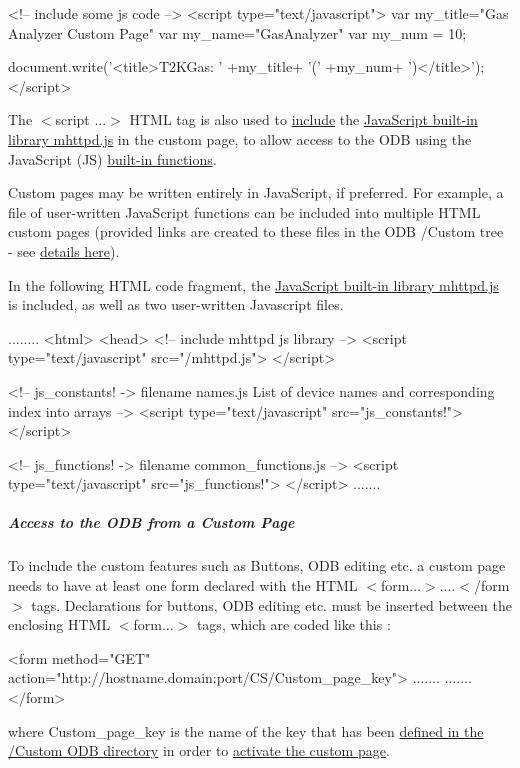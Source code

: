 \begin{DoxyCode}
<!-- include some js code -->
<script  type="text/javascript">
\code
var my_title="Gas Analyzer Custom Page"
var my_name="GasAnalyzer"
var my_num = 10;

document.write('<title>T2KGas: ' +my_title+ '(' +my_num+ ')</title>');
</script>
\end{DoxyCode}
 \par
 The $<$script ...$>$ HTML tag is also used to \hyperlink{RC_mhttpd_custom_js_lib_RC_mhttpd_include_js_library}{include} the \hyperlink{RC_mhttpd_custom_js_lib}{JavaScript built-\/in library mhttpd.js} in the custom page, to allow access to the ODB using the JavaScript (JS) \hyperlink{RC_mhttpd_custom_js_lib_RC_mhttpd_js_library_features}{built-\/in functions}. \par
Custom pages may be written entirely in JavaScript, if preferred. For example, a file of user-\/written JavaScript functions can be included into multiple HTML custom pages (provided links are created to these files in the ODB /Custom tree -\/ see \hyperlink{RC_mhttpd_Activate}{details here}).

In the following HTML code fragment, the \hyperlink{RC_mhttpd_custom_js_lib}{JavaScript built-\/in library mhttpd.js} is included, as well as two user-\/written Javascript files.


\begin{DoxyCode}
........
<html>
<head>
<!-- include mhttpd js library   -->
<script type="text/javascript"  src="/mhttpd.js">
</script>

<!-- js_constants! -> filename  names.js
List of device names and corresponding index into arrays
 -->
<script type="text/javascript"  src="js_constants!">
</script>

<!-- js_functions! -> filename  common_functions.js
 -->      
<script type="text/javascript"  src="js_functions!">
</script>
.......
\end{DoxyCode}




\hypertarget{RC_mhttpd_custom_features_RC_mhttpd_custom_key_access}{}\subparagraph{Access to the ODB from a Custom Page}\label{RC_mhttpd_custom_features_RC_mhttpd_custom_key_access}
To include the custom features such as Buttons, ODB editing etc. a custom page needs to have at least one form declared with the HTML  $<$form...$>$....$<$/form$>$  tags. Declarations for buttons, ODB editing etc. must be inserted between the enclosing HTML $<$form...$>$  tags, which are coded like this : 
\begin{DoxyCode}
<form method="GET" action="http://hostname.domain:port/CS/\<Custom_page_key\>">
.......
.......
</form>
\end{DoxyCode}
 where Custom\_\-page\_\-key is the name of the key that has been \hyperlink{RC_mhttpd_Activate_RC_odb_custom_keynames}{defined in the /Custom ODB directory} in order to \hyperlink{RC_mhttpd_Activate}{activate the custom page}.

